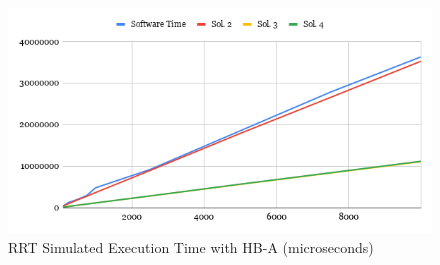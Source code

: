 \begin{figure}[H]
\begin{center}
    \includegraphics[width=0.9\linewidth]{chapters/chapter3/img/rrt-with-hba.png}
    \caption{RRT Simulated Execution Time with HB-A (microseconds)}
    \label{fig:rrt-with-hba}
\end{center}
\end{figure}
